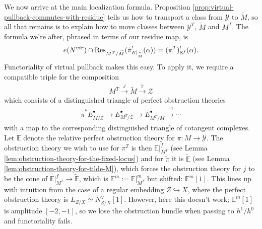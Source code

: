 \documentclass[12pt,dvipsnames]{amsart}
\begin{document}
We now arrive at the main localization formula. Proposition \ref{prop:virtual-pullback-commutes-with-residue} tells us how to transport a class from \(\mathcal Y\) to \(\widetilde M\), so all that remains is to explain how to move classes between \(\mathcal Y^T\), \(\widetilde M\) and \(M^T\). The formula we're after, phrased in terms of our residue map, is
\begin{align*}
  e(N^{vir})\cap \operatorname{Res}_{M^T/\widetilde{M}}(\tilde{\pi}_{E|_{\widetilde{M}}}^!(\alpha)) = (\pi^T)^!_{\mathbb{E}^f}(\alpha).
\end{align*}
Functoriality of virtual pullback \cite[Theorem 4.8]{manolache_VirtualPullbacks2012} makes this easy. To apply it, we require a compatible triple \cite[Definition 4.5]{manolache_VirtualPullbacks2012} for the composition
\begin{align*}
  M^T \xrightarrow{j} \widetilde M \xrightarrow{\widetilde \pi} \mathcal Z
\end{align*}
which consists of a distinguished triangle of perfect obstruction theories
\begin{align*}
  \widetilde \pi^* E^\bullet_{\widetilde M/\mathcal Z} \to E^\bullet_{M^T/\mathcal Z} \to E^\bullet_{M^T/\widetilde M} \xrightarrow{+1} \cdots
\end{align*}
with a map to the corresponding distinguished triangle of cotangent complexes. Let \(\mathbb E\) denote the relative perfect obstruction theory for \(\pi:M\to \mathcal Y\). The obstruction theory we wish to use for \(\pi^T\) is then \(\mathbb E|_{M^T}^f\) (see Lemma \ref{lem:obstruction-theory-for-the-fixed-locus}) and for \(\widetilde \pi\) it is \(\widetilde {\mathbb E}\) (see Lemma \ref{lem:obstruction-theory-for-tilde-M}), which forces the obstruction theory for \(j\) to be the cone of \(\mathbb E|_{M^T}^f\to \widetilde{\mathbb E}\), which is \(\mathbb E^m := \mathbb E|_{M^T}^m\) but shifted: \(\mathbb E^m[1]\). This lines up with intuition from the case of a regular embedding \(Z\hookrightarrow X\), where the perfect obstruction theory is \(L_{Z/X} \simeq N^\vee_{Z/X}[1]\). However, here this doesn't work; \(\mathbb E^m[1]\) is amplitude \([-2,-1]\), so we lose the obstruction bundle when passing to \(h^1/h^0\) and functoriality fails.
\end{document}
